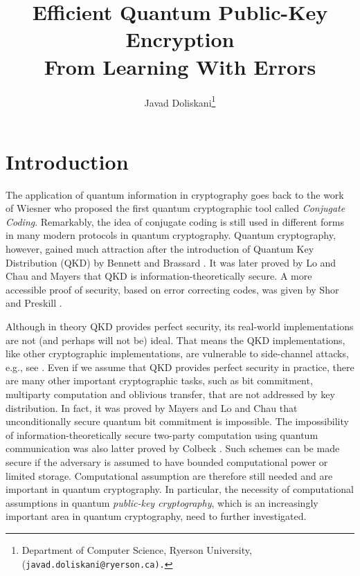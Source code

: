 \documentclass[11pt]{article}
\title{Efficient Quantum Public-Key Encryption \\ From Learning With Errors}
\author{
	Javad Doliskani\thanks{Department of Computer Science, Ryerson University,
	(\tt{javad.doliskani@ryerson.ca}).}
}
\date{}
\theoremstyle{plain}
\theoremstyle{definition}
\begin{document}
\maketitle
\newpage


\section{Introduction}
\label{sec:intro}

The application of quantum information in cryptography goes back to the work of Wiesner \cite{wiesner1983conjugate} who proposed the first quantum cryptographic tool called \textit{Conjugate Coding}. Remarkably, the idea of conjugate coding is still used in different forms in many modern protocols in quantum cryptography. Quantum cryptography, however, gained much attraction after the introduction of Quantum Key Distribution (QKD) by Bennett and Brassard \cite{bennett1983quantum, bennett1984quantum}. It was later proved by Lo and Chau \cite{lo1999unconditional} and Mayers \cite{mayers2001unconditional} that QKD is information-theoretically secure. A more accessible proof of security, based on error correcting codes, was  given by Shor and Preskill \cite{shor2000simple}. 


Although in theory QKD provides perfect security, its real-world implementations are not (and perhaps will not be) ideal. That means the QKD implementations, like other cryptographic implementations, are vulnerable to side-channel attacks, e.g., see \cite{lydersen2010hacking}. Even if we assume that QKD provides perfect security in practice, there are many other important cryptographic tasks, such as bit commitment, multiparty computation and oblivious transfer, that are not addressed by key distribution. In fact, it was proved by Mayers \cite{mayers1997unconditionally} and Lo and Chau \cite{lo1997quantum} that unconditionally secure quantum bit commitment is impossible. The impossibility of information-theoretically secure two-party computation using quantum communication was also latter proved by Colbeck \cite{colbeck2007impossibility}. Such schemes can be made secure if the adversary is assumed to have bounded computational power or limited storage. Computational assumption are therefore still needed and are important in quantum cryptography. In particular, the necessity of computational assumptions in quantum \textit{public-key cryptography}, which is an increasingly important area in quantum cryptography, need to further investigated.
\end{document}
